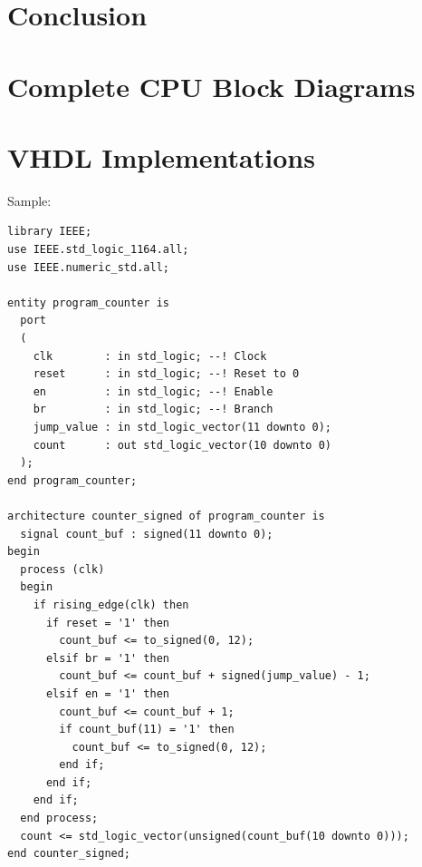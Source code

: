 \documentclass[lettersize,journal]{IEEEtran}
\begin{document}
\section{Conclusion}
\color{red}{TBD}\color{black}

{\appendices
\section*{Complete CPU Block Diagrams}
\color{red}{TBD}\color{black}

\section*{VHDL Implementations}
Sample:
\color{red}{TBD due to current overfull issues...}\color{black}\\
\begin{Verbatim}[breaklines]
    library IEEE;
use IEEE.std_logic_1164.all;
use IEEE.numeric_std.all;

entity program_counter is
  port
  (
    clk        : in std_logic; --! Clock
    reset      : in std_logic; --! Reset to 0
    en         : in std_logic; --! Enable
    br         : in std_logic; --! Branch
    jump_value : in std_logic_vector(11 downto 0);
    count      : out std_logic_vector(10 downto 0)
  );
end program_counter;

architecture counter_signed of program_counter is
  signal count_buf : signed(11 downto 0);
begin
  process (clk)
  begin
    if rising_edge(clk) then
      if reset = '1' then
        count_buf <= to_signed(0, 12);
      elsif br = '1' then
        count_buf <= count_buf + signed(jump_value) - 1;
      elsif en = '1' then
        count_buf <= count_buf + 1;
        if count_buf(11) = '1' then
          count_buf <= to_signed(0, 12);
        end if;
      end if;
    end if;
  end process;
  count <= std_logic_vector(unsigned(count_buf(10 downto 0)));
end counter_signed;
\end{Verbatim}
}

\nocite{*}

\end{document}
